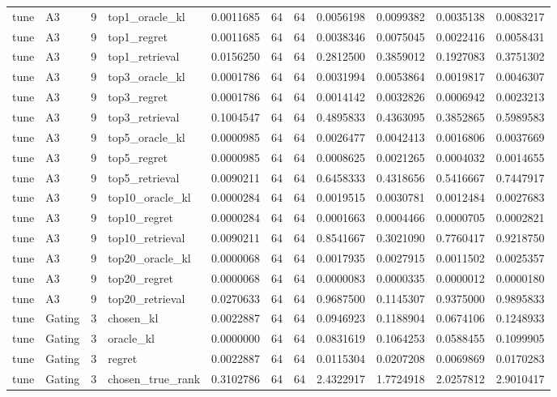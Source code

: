 \begin{tabular}{llrlrrrrrrr}
tune & A3 & 9 & top1_oracle_kl & 0.0011685 & 64 & 64 & 0.0056198 & 0.0099382 & 0.0035138 & 0.0083217 \\
tune & A3 & 9 & top1_regret & 0.0011685 & 64 & 64 & 0.0038346 & 0.0075045 & 0.0022416 & 0.0058431 \\
tune & A3 & 9 & top1_retrieval & 0.0156250 & 64 & 64 & 0.2812500 & 0.3859012 & 0.1927083 & 0.3751302 \\
tune & A3 & 9 & top3_oracle_kl & 0.0001786 & 64 & 64 & 0.0031994 & 0.0053864 & 0.0019817 & 0.0046307 \\
tune & A3 & 9 & top3_regret & 0.0001786 & 64 & 64 & 0.0014142 & 0.0032826 & 0.0006942 & 0.0023213 \\
tune & A3 & 9 & top3_retrieval & 0.1004547 & 64 & 64 & 0.4895833 & 0.4363095 & 0.3852865 & 0.5989583 \\
tune & A3 & 9 & top5_oracle_kl & 0.0000985 & 64 & 64 & 0.0026477 & 0.0042413 & 0.0016806 & 0.0037669 \\
tune & A3 & 9 & top5_regret & 0.0000985 & 64 & 64 & 0.0008625 & 0.0021265 & 0.0004032 & 0.0014655 \\
tune & A3 & 9 & top5_retrieval & 0.0090211 & 64 & 64 & 0.6458333 & 0.4318656 & 0.5416667 & 0.7447917 \\
tune & A3 & 9 & top10_oracle_kl & 0.0000284 & 64 & 64 & 0.0019515 & 0.0030781 & 0.0012484 & 0.0027683 \\
tune & A3 & 9 & top10_regret & 0.0000284 & 64 & 64 & 0.0001663 & 0.0004466 & 0.0000705 & 0.0002821 \\
tune & A3 & 9 & top10_retrieval & 0.0090211 & 64 & 64 & 0.8541667 & 0.3021090 & 0.7760417 & 0.9218750 \\
tune & A3 & 9 & top20_oracle_kl & 0.0000068 & 64 & 64 & 0.0017935 & 0.0027915 & 0.0011502 & 0.0025357 \\
tune & A3 & 9 & top20_regret & 0.0000068 & 64 & 64 & 0.0000083 & 0.0000335 & 0.0000012 & 0.0000180 \\
tune & A3 & 9 & top20_retrieval & 0.0270633 & 64 & 64 & 0.9687500 & 0.1145307 & 0.9375000 & 0.9895833 \\
tune & Gating & 3 & chosen_kl & 0.0022887 & 64 & 64 & 0.0946923 & 0.1188904 & 0.0674106 & 0.1248933 \\
tune & Gating & 3 & oracle_kl & 0.0000000 & 64 & 64 & 0.0831619 & 0.1064253 & 0.0588455 & 0.1099905 \\
tune & Gating & 3 & regret & 0.0022887 & 64 & 64 & 0.0115304 & 0.0207208 & 0.0069869 & 0.0170283 \\
tune & Gating & 3 & chosen_true_rank & 0.3102786 & 64 & 64 & 2.4322917 & 1.7724918 & 2.0257812 & 2.9010417 \\

\end{tabular}
